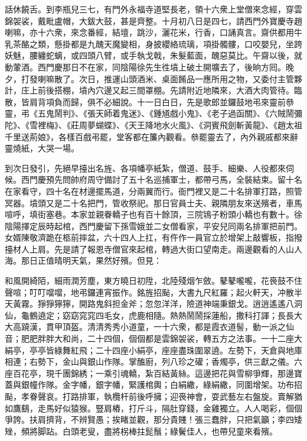 話休饒舌。到李瓶兒三七，有門外永福寺道堅長老，領十六衆上堂僧來念經，穿雲錦袈裟，戴毗盧帽，大鈸大鼓，甚是齊整。{}十月初八日是四七，請西門外寶慶寺趙喇嘛，亦十六衆，來念番經，結壇，跳沙，灑花米，行香，口誦真言。齋供都用牛乳茶酪之類，懸掛都是九醜天魔變相，身披纓絡琉璃，項掛髑髏，口咬嬰兒，坐跨妖魅，腰纏蛇螭，或四頭八臂，或手執戈戟，朱髮藍面，醜惡莫比。午齋以後，就動葷酒。西門慶那日不在家，同陰陽徐先生徃墳上破土開壙去了，後晌方囘。晚夕，打發喇嘛散了。次日，推運山頭酒米、桌面餚品一應所用之物，又委付主管夥計，庄上前後搭棚，墳內穴邊又起三間罩棚。先請附近地隣來，大酒大肉管待。臨散，皆肩背項負而歸，{}俱不必細說。十一日白日，先是歌郎並鑼鼓地弔來靈前叅靈，弔《五鬼鬧判》、《張天師着鬼迷》、《鍾馗戲小鬼》、《老子過函關》、《六賊鬧彌陀》、《雪裡梅》、《莊周夢蝴蝶》、《天王降地水火風》、《洞賓飛劍斬黃龍》、《趙太祖千里送荊娘》，各樣百戲弔罷，堂客都在簾內觀看。叅罷靈去了，內外親戚都來辭靈燒紙，大哭一場。

到次日發引，先絕早擡出名旌、各項幡亭紙紮，僧道、鼓手、細樂、人役都來伺候。西門慶預先問帥府周守備討了五十名巡捕軍士，都帶弓馬，全裝結束。留十名在家看守，四十名在材邊擺馬道，分兩翼而行。衙門裡又是二十名排軍打路，照管冥器。墳頭又是二十名把門，管收祭祀。那日官員士夫、親隣朋友來送殯者，車馬喧呼，填街塞巷。本家並親眷轎子也有百十餘頂，三院鴇子粉頭小轎也有數十。徐陰陽擇定辰時起棺，西門慶留下孫雪娥並二女僧看家，平安兒同兩名排軍把前門。女婿陳敬濟跪在柩前摔盆，{}六十四人上扛，有仵作一員官立於增架上敲響板，指撥擡材人上肩。先是請了報恩寺僧官來起棺，轉過大街口望南走。兩邊觀看的人山人海。那日正值晴明天氣，果然好殯。但見：

\begin{myquote}
和風開綺陌，細雨潤芳塵，東方曉日初陞，北陸殘烟乍斂。鼕鼕嚨嚨，花䘮鼓不住聲喧；叮叮噹噹，地弔鑼連宵振作。銘旌招颭，大書九尺紅羅；起火軒天，冲散半天黃霧。猙猙獰獰，開路鬼斜担金斧；忽忽洋洋，險道神端秉銀戈。逍逍遙遙八洞仙，龜鶴遶定；窈窈窕窕四毛女，虎鹿相隨。熱熱鬧鬧採蓮船，撒科打諢；長長大大高蹺漢，貫甲頂盔。清清秀秀小道童，一十六衆，都是霞衣道髻，動一派之仙音；肥肥胖胖大和尚，二十四個，個個都是雲錦袈裟，轉五方之法事。一十二座大絹亭，亭亭皆綠舞紅飛；二十四座小絹亭，座座盡珠圍翠遶。左勢下，天倉與地庫相連；右勢下，金山與銀山作隊。掌醢廚，列八珍之礶；香燭亭，供三獻之儀。六座百花亭，現千團錦綉；一乘引魂轎，紮百結黃絲。這邊把花與雪柳爭輝，那邊寶蓋與銀幢作隊。金字幡，銀字幡，緊護棺輿；白絹繖，綠絹繖，同圍增架。功布招颭，孝眷聲哀。打路排軍，執欖杆前後呼擁；迎䘮神會，耍武藝左右盤旋。賣解猶如鷹鷂，走馬好似猿猴。豎肩樁，打斤斗，隔肚穿錢，金雞獨立。人人喝彩，個個爭誇。扶肩擠背，不辨賢愚；挨睹並觀，那分貴賤！張三蠢胖，只把氣籲；李四矮矬，頻將脚跕。白頭老叟，盡將柺棒拄髭鬚；綠鬢佳人，也帶兒童來看殯。
\end{myquote}


